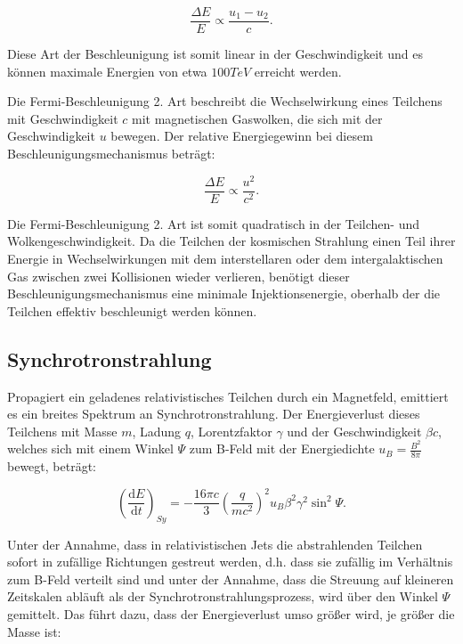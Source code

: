 \begin{equation}
 \frac{\Delta E}{E}\propto \frac{u_1-u_2}{c}.
\end{equation}

Diese Art der Beschleunigung ist somit linear in der Geschwindigkeit und es können maximale Energien von etwa $100\si{TeV}$ erreicht werden.\cite{Grupen}\cite{Longair}

Die Fermi-Beschleunigung 2. Art beschreibt die Wechselwirkung eines Teilchens mit Geschwindigkeit $c$ mit magnetischen Gaswolken, die sich mit der Geschwindigkeit $u$ bewegen.
Der relative Energiegewinn bei diesem Beschleunigungsmechanismus beträgt:

\begin{equation}
 \frac{\Delta E}{E}\propto \frac{u^2}{c^2}.
\end{equation}

Die Fermi-Beschleunigung 2. Art ist somit quadratisch in der Teilchen- und Wolkengeschwindigkeit.
Da die Teilchen der kosmischen Strahlung einen Teil ihrer Energie in Wechselwirkungen mit dem interstellaren oder dem intergalaktischen Gas zwischen zwei Kollisionen wieder verlieren, benötigt dieser Beschleunigungsmechanismus eine minimale Injektionsenergie, oberhalb der die Teilchen effektiv beschleunigt werden können.\cite{Grupen}\cite{Longair}


\subsection{Synchrotronstrahlung}
Propagiert ein geladenes relativistisches Teilchen durch ein Magnetfeld, emittiert es ein breites Spektrum an Synchrotronstrahlung.
Der Energieverlust dieses Teilchens mit Masse $m$, Ladung $q$, Lorentzfaktor $\gamma$ und der Geschwindigkeit $\beta c$, welches sich mit einem Winkel $\Psi$ zum B-Feld mit der Energiedichte $u_B=\frac{B^2}{8\pi}$ bewegt, beträgt:

\begin{equation}
 \left( \frac{\mathrm{d}E}{\mathrm{d}t} \right)_{Sy} = - \frac{16 \pi c}{3} \left(\frac{q}{mc^2} \right)^2 u_B \beta^2 \gamma^2 \sin^2{\Psi}.
\end{equation}

Unter der Annahme, dass in relativistischen Jets die abstrahlenden Teilchen sofort in zufällige Richtungen gestreut werden, d.h. dass sie zufällig im Verhältnis zum B-Feld verteilt sind und unter der Annahme, dass die Streuung auf kleineren Zeitskalen abläuft als der Synchrotronstrahlungsprozess, wird über den Winkel $\Psi$ gemittelt.
Das führt dazu, dass der Energieverlust umso größer wird, je größer die Masse ist:

